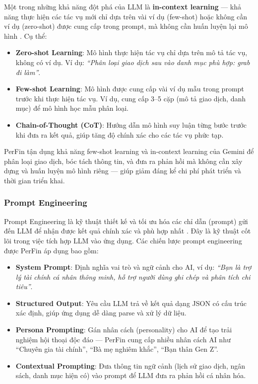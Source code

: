 Một trong những khả năng đột phá của LLM là \textbf{in-context learning} --- khả năng thực hiện các tác vụ mới chỉ dựa trên vài ví dụ (few-shot) hoặc không cần ví dụ (zero-shot) được cung cấp trong prompt, mà không cần huấn luyện lại mô hình \cite{ref10}. Cụ thể:

\begin{itemize}
    \item \textbf{Zero-shot Learning}: Mô hình thực hiện tác vụ chỉ dựa trên mô tả tác vụ, không có ví dụ. Ví dụ: \textit{``Phân loại giao dịch sau vào danh mục phù hợp: grab đi làm''}.
    \item \textbf{Few-shot Learning}: Mô hình được cung cấp vài ví dụ mẫu trong prompt trước khi thực hiện tác vụ. Ví dụ, cung cấp 3--5 cặp (mô tả giao dịch, danh mục) để mô hình học mẫu phân loại.
    \item \textbf{Chain-of-Thought (CoT)}: Hướng dẫn mô hình suy luận từng bước trước khi đưa ra kết quả, giúp tăng độ chính xác cho các tác vụ phức tạp.
\end{itemize}

PerFin tận dụng khả năng few-shot learning và in-context learning của Gemini để phân loại giao dịch, bóc tách thông tin, và đưa ra phản hồi mà không cần xây dựng và huấn luyện mô hình riêng --- giúp giảm đáng kể chi phí phát triển và thời gian triển khai.

\subsubsection{Prompt Engineering}

Prompt Engineering là kỹ thuật thiết kế và tối ưu hóa các chỉ dẫn (prompt) gửi đến LLM để nhận được kết quả chính xác và phù hợp nhất \cite{ref12}. Đây là kỹ thuật cốt lõi trong việc tích hợp LLM vào ứng dụng. Các chiến lược prompt engineering được PerFin áp dụng bao gồm:

\begin{itemize}
    \item \textbf{System Prompt}: Định nghĩa vai trò và ngữ cảnh cho AI, ví dụ: \textit{``Bạn là trợ lý tài chính cá nhân thông minh, hỗ trợ người dùng ghi chép và phân tích chi tiêu''}.
    \item \textbf{Structured Output}: Yêu cầu LLM trả về kết quả dạng JSON có cấu trúc xác định, giúp ứng dụng dễ dàng parse và xử lý dữ liệu.
    \item \textbf{Persona Prompting}: Gán nhân cách (personality) cho AI để tạo trải nghiệm hội thoại độc đáo --- PerFin cung cấp nhiều nhân cách AI như ``Chuyên gia tài chính'', ``Bà mẹ nghiêm khắc'', ``Bạn thân Gen Z''.
    \item \textbf{Contextual Prompting}: Đưa thông tin ngữ cảnh (lịch sử giao dịch, ngân sách, danh mục hiện có) vào prompt để LLM đưa ra phản hồi cá nhân hóa.
\end{itemize}

